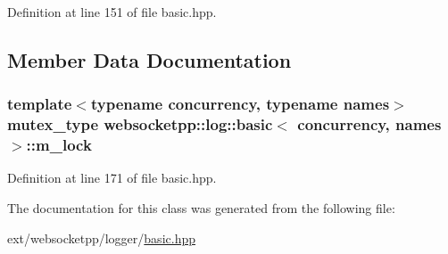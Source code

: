 Definition at line 151 of file basic.\+hpp.



\subsection{Member Data Documentation}
\hypertarget{classwebsocketpp_1_1log_1_1basic_ad837b993a6e1070fbd3c1dc59b15a0eb}{}
\subsubsection[{m\+\_\+lock}]{\setlength{\rightskip}{0pt plus 5cm}template$<$typename concurrency, typename names$>$ {\bf mutex\+\_\+type} {\bf websocketpp\+::log\+::basic}$<$ concurrency, names $>$\+::m\+\_\+lock\hspace{0.3cm}{\ttfamily [protected]}}\label{classwebsocketpp_1_1log_1_1basic_ad837b993a6e1070fbd3c1dc59b15a0eb}


Definition at line 171 of file basic.\+hpp.



The documentation for this class was generated from the following file\+:\begin{DoxyCompactItemize}
\item 
ext/websocketpp/logger/\hyperlink{logger_2basic_8hpp}{basic.\+hpp}\end{DoxyCompactItemize}
